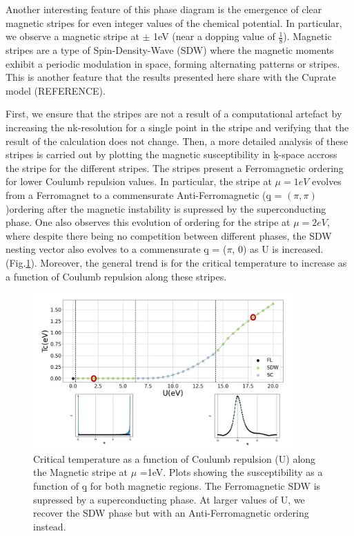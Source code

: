 \documentclass[12pt]{article}
\begin{document}
\medskip
\noindent Another interesting feature of this phase diagram is the emergence of clear magnetic stripes for even integer values of the chemical potential. In particular, we observe a magnetic stripe at $\pm$ 1eV (near a dopping value of $\frac{1}{8}$).  Magnetic stripes are a type of Spin-Density-Wave (SDW) where the magnetic moments exhibit a periodic modulation in space, forming alternating patterns or stripes. This is another feature that the results presented here share with the Cuprate model (REFERENCE).\par
\medskip
\noindent First, we ensure that the stripes are not a result of a computational artefact by increasing the nk-resolution  for a single point in the stripe and verifying that the result of the calculation does not change. Then, a more detailed analysis of these stripes is carried out by plotting the magnetic susceptibility in \b{k}-space accross the stripe for the different stripes. 
The stripes present a Ferromagnetic ordering for lower Coulumb repulsion values. In particular, the stripe at $\mu =1eV$ evolves from a Ferromagnet to a commensurate Anti-Ferromagnetic (\b{q} = $(\pi, \pi)$)ordering after the magnetic instability is supressed by the superconducting phase. One also observes this evolution of ordering for the stripe at $\mu =2eV$, where despite there being no competition between different phases, the SDW  nesting vector also evolves to a commensurate \b{q} = ($\pi$, 0) as U is increased. 
(Fig.\ref{fig:1NN_stripes}). Moreover, the general trend is for  the critical temperature to increase as a function of Coulumb repulsion along these stripes. 

\begin{figure}[htbp]  %
    \centering
    \includegraphics[width=0.9\textwidth]{1NN_SDW_stripes.png}  %
    \caption{Critical temperature as a function of Coulumb repulsion (U) along the Magnetic stripe at $\mu$ =1eV. Plots showing the susceptibility as a function of \b{q} for both magnetic regions. The Ferromagnetic SDW is supressed by a superconducting phase. At larger values of U, we recover the SDW phase but with an Anti-Ferromagnetic ordering instead.  }
    \label{fig:1NN_stripes}
\end{figure}
\end{document}
